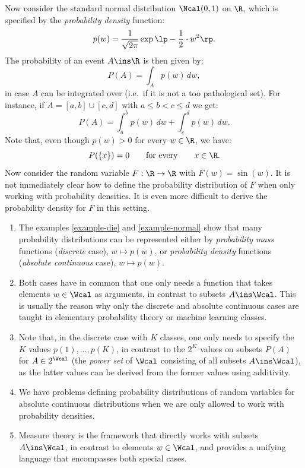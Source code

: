 \begin{Eg}%
    \label{example-normal}
    Now consider the standard normal distribution $\Ncal(0,1)$ on $\R$, which is specified by the \emph{probability density} function:
    \[ p(w) = \frac{1}{\sqrt{2 \pi}} \exp\lp - \frac{1}{2} \cdot w^2 \rp.   \]
    The probability of an event $A \ins \R$ is then given by:
    \[ P(A) = \int_A p(w) \, dw,\]
    in case $A$ can be integrated over (i.e.\ if it is not a too pathological set).
    For instance, if $A= [a,b] \cup [c,d]$ with $a \le b <c\le d$ we get:
    \[P(A) = \int_a^b p(w)\,dw + \int_c^d p(w)\,dw.\]
    Note that, even though $p(w) >0$ for every $w \in \R$, we have:
\[  P(\{x\}) = 0 \qquad \text{for every} \qquad  x \in \R.\]
Now consider the random variable $F: \R \to \R$ with $F(w)=\sin(w)$. 
It is not immediately clear how to define the probability distribution of $F$ when only working with probability densities. It is even more difficult to derive the probability density for $F$ in this setting.
\end{Eg}%

\begin{Disc}%
    \begin{enumerate}
        \item The examples \ref{example-die} and \ref{example-normal} show that many probability distributions can be represented either by \emph{probability mass} functions (\emph{discrete} case), $w \mapsto p(w)$, or \emph{probability density} functions (\emph{absolute continuous} case), $w \mapsto p(w)$.
        \item Both cases have in common that one only needs a function that takes elements $w \in \Wcal$ as arguments, in contrast to subsets $A \ins \Wcal$. This is usually the reason why only the discrete and absolute continuous cases are taught in elementary probability theory or machine learning classes.
        \item Note that, in the discrete case with $K$ classes, one only needs to specify the $K$ values $p(1),\dots,p(K)$, in contrast to the $2^K$ values on subsets $P(A)$ for $A \in 2^\Wcal$ (the \emph{power set} of $\Wcal$ consisting of all subsets $A \ins \Wcal$), as the latter values can be derived from the former values using additivity.
        \item We have problems defining probability distributions of random variables for absolute continuous distributions when we are only allowed to work with probability densities.
        \item Measure theory is the framework that directly works with subsets $A \ins \Wcal$, in contrast to elements $w \in \Wcal$, and provides a unifying language that encompasses both special cases.
    \end{enumerate}
\end{Disc}%

